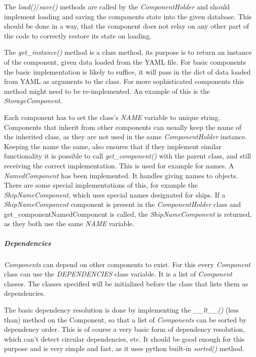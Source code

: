 The \textit{load()}/\textit{save()} methods are called by the \textit{ComponentHolder} and should
implement loading and saving the components state into the given database. This should be done in a way, that the
component does not relay on any other part of the code to correctly restore its state on loading.

The \textit{get\_instance()} method is a class method, its purpose is to return an instance of the component, given data loaded
from the YAML file. For basic components the basic implementation is likely to suffice, it will pass in the dict of data
loaded from YAML as arguments to the class. For more sophisticated components this method might need to be
re-implemented. An example of this is the \textit{StorageComponent}.

Each component has to set the class's \textit{NAME} variable to unique string. Components that inherit from other
components can usually keep the name of the inherited class, as they are not used in the same \textit{ComponentHolder}
instance. Keeping the name the same, also ensures that if they implement similar functionality it is possible to call
\textit{get\_component()} with the parent class, and still receiving the correct implementation. This is used for example
for names. A \textit{NamedComponent} has been implemented. It handles giving names to objects. There are some special
implementations of this, for example the \textit{ShipNameComponent}, which uses special names designated for ships. If a
\textit{ShipNameComponent} component is present in the \textit{ComponentHolder} class and get\_component{NamedComponent}
is called, the \textit{ShipNameComponent} is returned, as they both use the same \textit{NAME} variable.

\subparagraph{Dependencies}
\textit{Components} can depend on other components to exist. For this every \textit{Component} class can use the
\textit{DEPENDENCIES} class variable. It is a list of \textit{Component} classes. The classes specified will be
initialized before the class that lists them as dependencies. 

The basic dependency resolution is done by implementing the \textit{\_\_lt\_\_()} (less than) method on the Component,
so that a list of \textit{Components} can be sorted by dependency order. This is of course a very basic form of
dependency resolution, which can't detect circular dependencies, etc. It should be good enough for this purpose and is very
simple and fast, as it uses python built-in \textit{sorted()} method.

